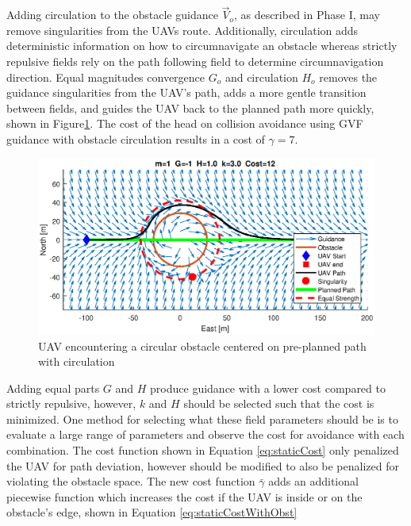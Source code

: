\documentclass[numbered,pdftex]{ohio-etd}
\begin{document}
Adding circulation to the obstacle guidance $\overrightarrow{V}_o$, as described in Phase I, may remove singularities from the UAVs route. Additionally, circulation adds deterministic information on how to circumnavigate an obstacle whereas strictly repulsive fields rely on the path following field to determine circumnavigation direction. Equal magnitudes convergence $G_o$ and circulation $H_o$ removes the guidance singularities from the UAV's path, adds a more gentle transition between fields, and guides the UAV back to the planned path more quickly, shown in Figure\ref{fig:uavPathObstWithCirc}. The cost of the head on collision avoidance using GVF guidance with obstacle circulation results in a cost of $\gamma=7$.



\begin{figure}[H]
	\centering
	\includegraphics[trim=0 85 0 85,clip,width=15cm]{PaperFigures/Methods/bruteForceSolvedN1V10WithCirc}
	\caption{UAV encountering a circular obstacle centered on pre-planned path with circulation}
	\label{fig:uavPathObstWithCirc}
\end{figure}

Adding equal parts $G$ and $H$ produce guidance with a lower cost compared to strictly repulsive, however, $k$ and $H$ should be selected such that the cost is minimized. One method for selecting what these field parameters should be is to evaluate a large range of parameters and observe the cost for avoidance with each combination. The cost function shown in Equation \ref{eq:staticCost} only penalized the UAV for path deviation, however should be modified to also be penalized for violating the obstacle space. The new cost function $\bar{\gamma}$ adds an additional piecewise function which increases the cost if the UAV is inside or on the obstacle's edge, shown in Equation \ref{eq:staticCostWithObst}
\end{document}
